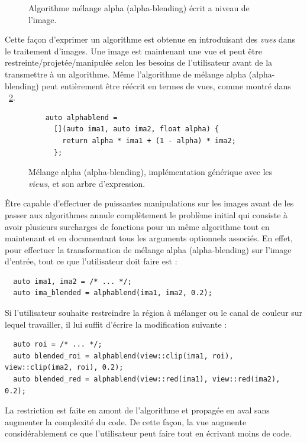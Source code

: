 \begin{figure}[htbp]
  \centering
  

  \caption[]{Algorithme mélange alpha (alpha-blending) écrit a niveau de l'image.}
  \label{resume:fig:view.alphablend}
\end{figure}

Cette façon d'exprimer un algorithme est obtenue en introduisant des \emph{vues} dans le traitement d'images. Une image
est maintenant une vue et peut être restreinte/projetée/manipulée selon les besoins de l'utilisateur avant de la
transmettre à un algorithme. Même l'algorithme de mélange alpha (alpha-blending) peut entièrement être réécrit en termes
de vues, comme montré dans ~\cref{resume:fig:new.alphablend}.

\begin{figure}[htbp]
  \centering
  \begin{minipage}[b]{5.5cm}
    
  \end{minipage}
  \begin{minipage}[b]{5.5cm}
    \begin{verbatim}
    auto alphablend =
      [](auto ima1, auto ima2, float alpha) {
        return alpha * ima1 + (1 - alpha) * ima2;
      };
    \end{verbatim}
    \bigskip
    \bigskip
    \bigskip
  \end{minipage}
  \caption[]{Mélange alpha (alpha-blending), implémentation générique avec les \emph{views}, et son arbre d'expression.}
  \label{resume:fig:new.alphablend}
\end{figure}

Être capable d'effectuer de puissantes manipulations sur les images avant de les passer aux algorithmes annule
complètement le problème initial qui consiste à avoir plusieurs surcharges de fonctions pour un même algorithme tout en
maintenant et en documentant tous les arguments optionnels associés. En effet, pour effectuer la transformation de
mélange alpha (alpha-blending) sur l'image d'entrée, tout ce que l'utilisateur doit faire est :
\begin{verbatim}
  auto ima1, ima2 = /* ... */;
  auto ima_blended = alphablend(ima1, ima2, 0.2);
\end{verbatim}
Si l'utilisateur souhaite restreindre la région à mélanger ou le canal de couleur sur lequel travailler, il lui suffit
d'écrire la modification suivante :
\begin{verbatim}
  auto roi = /* ... */;
  auto blended_roi = alphablend(view::clip(ima1, roi), view::clip(ima2, roi), 0.2);
  auto blended_red = alphablend(view::red(ima1), view::red(ima2), 0.2);
\end{verbatim}
La restriction est faite en amont de l'algorithme et propagée en aval sans augmenter la complexité du code. De cette
façon, la vue augmente considérablement ce que l'utilisateur peut faire tout en écrivant moins de code.

